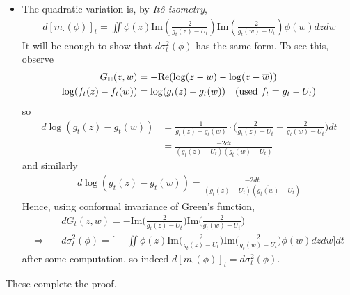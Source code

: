 \documentclass[12pt,a4paper]{article}
\newenvironment{proof}
{\begin{changemargin}{0.5cm}{0.5cm} 
	}%
	{\end{changemargin}
}
\renewenvironment{i}
{\begin{itemize} 
	}%
	{\end{itemize}
}
\newenvironment{p}
{\begin{proof} 
	}%
	{\end{proof}
}
\begin{document}
\begin{p}
\begin{i}
\item The quadratic variation is, by \emph{It\^o isometry},
\begin{align*}
d[m_{\cdot}(\phi)]_t = \iint \phi(z) \text{Im}(\frac{2}{g_t(z)- U_t}) \text{Im}(\frac{2}{g_t(w)- U_t})\phi(w) dzdw
\end{align*}
It will be enough to show that $d\sigma_t^2(\phi)$ has the same form. To see this, observe
\begin{align*}
G_{\mathbb{H}}(z,w) &= - \text{Re}(\log(z-w) - \log(z-\overline{w})) \\
\log (f_t(z) - f_t(w)) &= \log (g_t(z) - g_t(w)) \quad (\text{used }f_t = g_t- U_t)
\end{align*}
so
\begin{align*}
d \log (g_t(z) - g_t(w)) &= \frac{1}{g_t(z) - g_t(w)} \cdot \Big( \frac{2}{g_t(z) - U_t} -\frac{2}{g_t(w)-U_t} \Big) dt \\
&=\frac{-2dt}{(g_t(z) - U_t)(g_t(w) - U_t)}
\end{align*}
and similarly
\begin{align*}
d\log (g_t(z) - \overline{g_t(w)}) = \frac{-2dt}{(g_t(z) - U_t)(\overline{g_t(w)} - U_t)}
\end{align*}
Hence, using conformal invariance of Green's function,
\begin{align*}
& dG_t(z,w) = -\text{Im}\Big( \frac{2}{g_t(z) - U_t} \Big) \text{Im}\Big(\frac{2}{g_t(w) - U_t} \Big) \\
\Rightarrow \quad & d\sigma_t^2(\phi) = \Big[ -\iint \phi(z) \text{Im}\big(\frac{2}{g_t(z) - U_t}\big) \text{Im}\big(\frac{2}{g_t(w) - U_t}\big) \phi(w) dzdw\Big]dt
\end{align*}
after some computation. so indeed $d[m_{\cdot}(\phi)]_t = d\sigma_t^2(\phi)$.
\end{i} 
These complete the proof.

\eop
\end{p}
\end{document}
